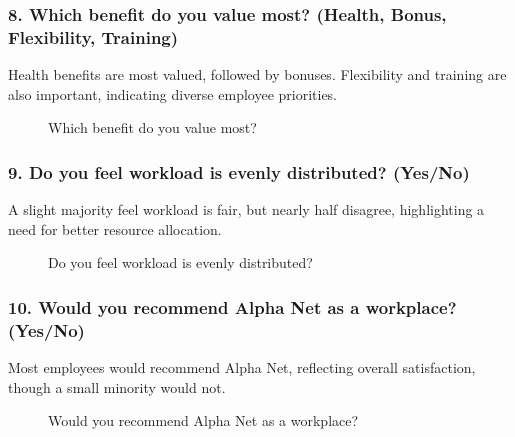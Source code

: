 \subsubsection*{8. Which benefit do you value most? (Health, Bonus, Flexibility, Training)}

Health benefits are most valued, followed by bonuses. Flexibility and training are also important, indicating diverse employee priorities.

\begin{figure}[H]
    \centering
    \caption{Which benefit do you value most?}
    \label{fig:benefit}
\end{figure}

\subsubsection*{9. Do you feel workload is evenly distributed? (Yes/No)}

A slight majority feel workload is fair, but nearly half disagree, highlighting a need for better resource allocation.

\begin{figure}[H]
    \centering
    \caption{Do you feel workload is evenly distributed?}
    \label{fig:workload}
\end{figure}

\subsubsection*{10. Would you recommend Alpha Net as a workplace? (Yes/No)}

Most employees would recommend Alpha Net, reflecting overall satisfaction, though a small minority would not.

\begin{figure}[H]
    \centering
    \caption{Would you recommend Alpha Net as a workplace?}
    \label{fig:recommend}
\end{figure}

